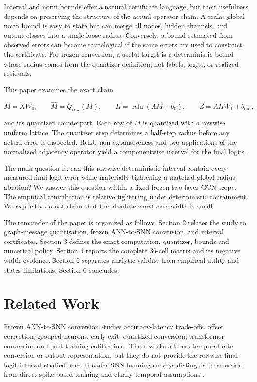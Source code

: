 \documentclass{article}
\begin{document}
Interval and norm bounds offer a natural certificate language, but their usefulness depends on preserving the structure of the actual operator chain. A scalar global norm bound is easy to state but can merge all nodes, hidden channels, and output classes into a single loose radius. Conversely, a bound estimated from observed errors can become tautological if the same errors are used to construct the certificate. For frozen conversion, a useful target is a deterministic bound whose radius comes from the quantizer definition, not labels, logits, or realized residuals.

This paper examines the exact chain

\[
M=XW_0,\qquad \widehat M=Q_{\mathrm{row}}(M),\qquad
H=\operatorname{relu}(AM+b_0),\qquad
Z=AHW_1+b_{\mathrm{out}},
\]

and its quantized counterpart. Each row of \(M\) is quantized with a rowwise uniform lattice. The quantizer step determines a half-step radius before any actual error is inspected. ReLU non-expansiveness and two applications of the normalized adjacency operator yield a componentwise interval for the final logits.

The main question is: can this rowwise deterministic interval contain every measured final-logit error while materially tightening a matched global-radius ablation? We answer this question within a fixed frozen two-layer GCN scope. The empirical contribution is relative tightening under deterministic containment. We explicitly do not claim that the absolute worst-case width is small.

The remainder of the paper is organized as follows. Section 2 relates the study to graph-message quantization, frozen ANN-to-SNN conversion, and interval certificates. Section 3 defines the exact computation, quantizer, bounds and numerical policy. Section 4 reports the complete 36-cell matrix and its negative width evidence. Section 5 separates analytic validity from empirical utility and states limitations. Section 6 concludes.

\section{Related Work}


Frozen ANN-to-SNN conversion studies accuracy-latency trade-offs, offset correction, grouped neurons, early exit, quantized conversion, transformer conversion and post-training calibration \cite{one-spike,hao2023offset,lv2024group,bu2023optimal,li2023seenn,hu2023fast,you2024spikezip,zhao2025ttfs,huang2025ecmt,li2024erroraware}. These works address temporal rate conversion or output representation, but they do not provide the rowwise final-logit interval studied here. Broader SNN learning surveys distinguish conversion from direct spike-based training and clarify temporal assumptions \cite{dampfhoffer2023snnlearning,nunes2022snnsurvey,wang2022taxonomicsnn}.
\end{document}
